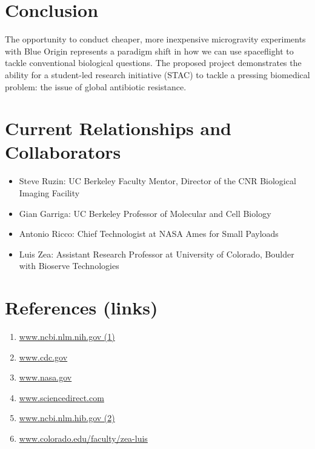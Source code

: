 \documentclass[twocolumn]{article}
\begin{document}
\section{Conclusion}
The opportunity to conduct cheaper, more inexpensive microgravity experiments with Blue Origin represents a paradigm shift in how we can use spaceflight to tackle conventional biological questions. The proposed project demonstrates the ability for a student-led research initiative (STAC) to tackle a pressing biomedical problem: the issue of global antibiotic resistance.  

\section{Current Relationships and Collaborators}
\begin{itemize}
    \item Steve Ruzin: UC Berkeley Faculty Mentor, Director of the CNR Biological Imaging Facility
    \item Gian Garriga: UC Berkeley Professor of Molecular and Cell Biology
    \item Antonio Ricco: Chief Technologist at NASA Ames for Small Payloads
    \item Luis Zea: Assistant Research Professor at University of Colorado, Boulder with Bioserve Technologies
\end{itemize}
\vspace{-4mm}
\section{References (links)}
\vspace{-2mm}
\begin{enumerate}[nosep]
    \item \textcolor{blue}{\href{https://www.ncbi.nlm.nih.gov/pmc/articles/PMC4165128/}{www.ncbi.nlm.nih.gov    (1)}}
    \item \textcolor{blue}{\href{https://www.cdc.gov/media/releases/2013/p0916-untreatable.html}{www.cdc.gov}}
    \item \textcolor{blue}{\href{https://www.nasa.gov/pdf/64249main_ffs_factsheets_hbp_atrophy.pdf}{www.nasa.gov}}
    \item \textcolor{blue}{\href{https://www.sciencedirect.com/science/article/abs/pii/S0167779906000266}{www.sciencedirect.com}}
    \item \textcolor{blue}{\href{https://www.ncbi.nlm.nih.gov/pmc/articles/PMC3589462/}{www.ncbi.nlm.hib.gov    (2)}}
    \item \textcolor{blue}{\href{https://www.colorado.edu/faculty/zea-luis/sites/default/files/attached-files/zea_-_thesis_-_published.pdf}{www.colorado.edu/faculty/zea-luis}}
\end{enumerate}
\end{document}
